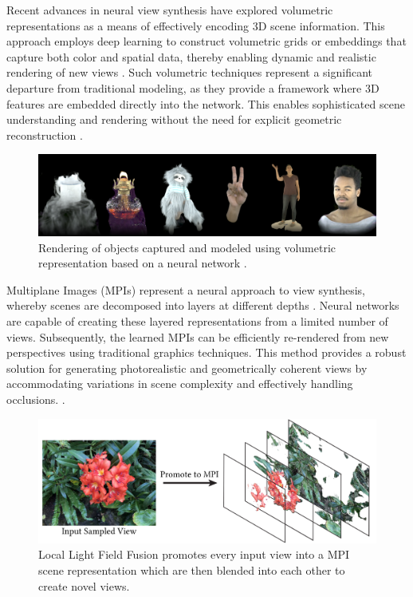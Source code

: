 Recent advances in neural view synthesis have explored volumetric representations as a means of effectively encoding 3D scene information.
This approach employs deep learning to construct volumetric grids or embeddings that capture both color and spatial data, thereby enabling dynamic and realistic rendering of new views .
Such volumetric techniques represent a significant departure from traditional modeling, as they provide a framework where 3D features are embedded directly into the network. This enables sophisticated scene understanding and rendering without the need for explicit geometric reconstruction \cite{lombardi_neural_2019,sitzmann_deepvoxels_2019}.

\begin{figure}[h!]
  \centering
	\includegraphics[width=\textwidth]{figures/bg-neural-volumetric.png}
	\caption{Rendering of objects captured and modeled using volumetric representation based on a neural network \cite{lombardi_neural_2019}.}
  \label{fig:background-neural-volumetric}
\end{figure}

Multiplane Images (MPIs) represent a neural approach to view synthesis, whereby scenes are decomposed into layers at different depths .
Neural networks are capable of creating these layered representations from a limited number of views.
Subsequently, the learned MPIs can be efficiently re-rendered from new perspectives using traditional graphics techniques.
This method provides a robust solution for generating photorealistic and geometrically coherent views by accommodating variations in scene complexity and effectively handling occlusions. \cite{mildenhall_local_2019,penner_soft_2017,pratul_p_srinivasan_pushing_2019,tao_zhou_stereo_2018}.


\begin{figure}[h!]
  \centering
	\includegraphics[width=.7\textwidth]{figures/background-mpi.png}
	\caption{Local Light Field Fusion \cite{mildenhall_local_2019} promotes every input view into a MPI scene representation which are then blended into each other to create novel views.}
  \label{fig:background-mpi}
\end{figure}

